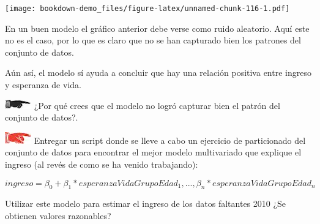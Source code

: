 \documentclass[]{book}
\theoremstyle{definition}
\theoremstyle{definition}
\theoremstyle{definition}
\theoremstyle{remark}
\begin{document}
\texttt{[image: bookdown-demo\_files/figure-latex/unnamed-chunk-116-1.pdf]}

En un buen modelo el gráfico anterior debe verse como ruido aleatorio.
Aquí este no es el caso, por lo que es claro que no se han capturado
bien los patrones del conjunto de datos.

Aún así, el modelo sí ayuda a concluir que hay una relación positiva
entre ingreso y esperanza de vida.

\includegraphics{./imagenes/manicule2.jpg} ¿Por qué crees que el modelo
no logró capturar bien el patrón del conjunto de datos?.

\includegraphics{./imagenes/manicule.jpg} Entregar un script donde se
lleve a cabo un ejercicio de particionado del conjunto de datos para
encontrar el mejor modelo multivariado que explique el ingreso (al revés
de como se ha venido trabajando):

\[ ingreso = \beta_{0} + \beta_{1}*esperanzaVidaGrupoEdad_1,...,\beta_{n}*esperanzaVidaGrupoEdad_n\]

Utilizar este modelo para estimar el ingreso de los datos faltantes 2010
¿Se obtienen valores razonables?


\end{document}

